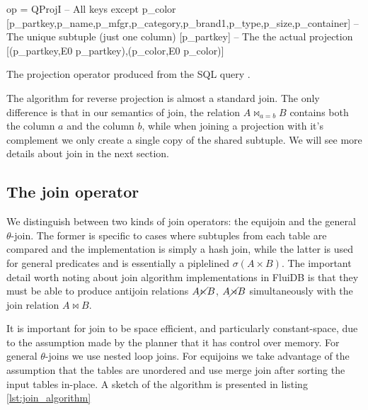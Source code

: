 \begin{code}
\begin{haskellcode}
op =
  QProjI
    -- All keys except p_color
    [p_partkey,p_name,p_mfgr,p_category,p_brand1,p_type,p_size,p_container]
    -- The unique subtuple (just one column)
    [p_partkey]
    -- The the actual projection
    [(p_partkey,E0 p_partkey),(p_color,E0 p_color)]
\end{haskellcode}
  \caption{\label{lst:real_proj_operator}The projection operator
    produced from the SQL query .}
\end{code}

The algorithm for reverse projection is almost a standard join. The
only difference is that in our semantics of join, the relation \(A
\Join_{a = b} B\) contains both the column \(a\) and the column \(b\),
while when joining a projection with it's complement we only create a
single copy of the shared subtuple. We will see more details about
join in the next section.


\subsection{The join operator}

We distinguish between two kinds of join operators: the equijoin and
the general \(\theta\)-join. The former is specific to cases where
subtuples from each table are compared and the implementation is
simply a hash join, while the latter is used for general predicates
and is essentially a piplelined \(\sigma(A \times B)\). The important
detail worth noting about join algorithm implementations in FluiDB is
that they must be able to produce antijoin relations \(A \cancel\ltimes B\),
\(A \cancel\rtimes B\) simultaneously with the join relation \(A \Join B\).

It is important for join to be space efficient, and particularly
constant-space, due to the assumption made by the planner that it has
control over memory. For general \(\theta\)-joins we use nested loop
joins. For equijoins we take advantage of the assumption that the
tables are unordered and use merge join after sorting the input tables
in-place. A sketch of the algorithm is presented in listing
\ref{lst:join_algorithm}

